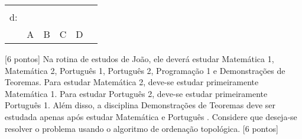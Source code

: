 \documentclass[16pt]{examdesign}
\begin{document}
\begin{fillin}[title={},
                    rearrange=no,resetcounter=no,suppressprefix]
\begin{question}
\begin{multicols}{4}
\begin{tabular}{|llllll|}
					    &                       &                       &                       &                       &  \\ \cline{2-5}
  \multicolumn{1}{|l|}{\multirow{2}{*}{d:}} & \multicolumn{1}{l|}{} & \multicolumn{1}{l|}{} & \multicolumn{1}{l|}{} & \multicolumn{1}{l|}{} &  \\
  \multicolumn{1}{|l|}{}                    & \multicolumn{1}{l|}{} & \multicolumn{1}{l|}{} & \multicolumn{1}{l|}{} & \multicolumn{1}{l|}{} &  \\ \cline{2-5}
					    & A                     & B                     & C                     & D                     &  \\ \hline
  \end{tabular}
\end{multicols}


\pagebreak
\end{question}
     \begin{question}
    
[6 pontos] Na rotina de estudos de João, ele deverá estudar Matemática 1, Matemática 2, Português 1, Português 2, Programação 1 e Demonstrações de Teoremas. 
Para estudar Matemática 2, deve-se estudar primeiramente Matemática 1. Para estudar Português 2, deve-se estudar primeiramente Português 1.
Além disso, a disciplina Demonstrações de Teoremas deve ser estudada apenas após estudar Matemática  e Português . Considere que deseja-se resolver o problema usando o algoritmo de ordenação topológica. [6 pontos]


\end{question}
\end{fillin}
\end{document}

